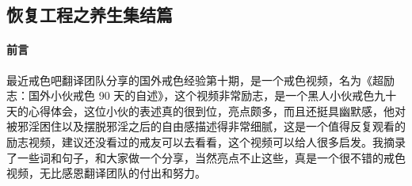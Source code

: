 \subsection{恢复工程之养生集结篇}

\paragraph*{前言}

最近戒色吧翻译团队分享的国外戒色经验第十期，是一个戒色视频，名为《超励志：国外小伙戒色 90 天的自述》，这个视频非常励志，是一个黑人小伙戒色九十天的心得体会，这位小伙的表述真的很到位，亮点颇多，而且还挺具幽默感，他对被邪淫困住以及摆脱邪淫之后的自由感描述得非常细腻，这是一个值得反复观看的励志视频，建议还没看过的戒友可以去看看，这个视频可以给人很多启发。我摘录了一些词和句子，和大家做一个分享，当然亮点不止这些，真是一个很不错的戒色视频，无比感恩翻译团队的付出和努力。

